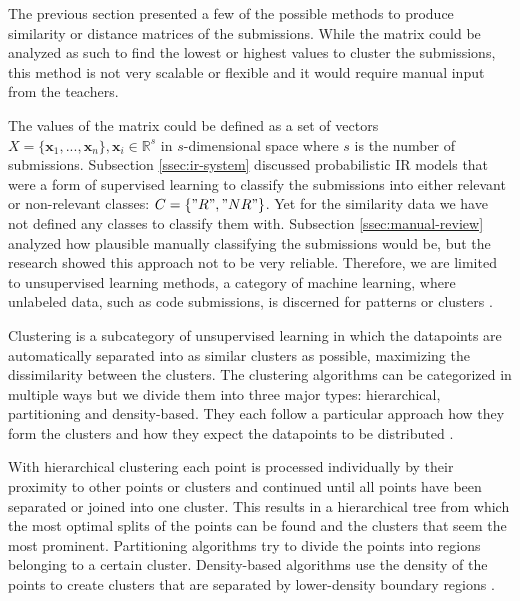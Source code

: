 The previous section presented a few of the possible methods to produce similarity or distance matrices of the submissions. While the matrix could be analyzed as such to find the lowest or highest values to cluster the submissions, this method is not very scalable or flexible and it would require manual input from the teachers.

The values of the matrix could be defined as a set of vectors $X=\{\mathbf{x}_1, ..., \mathbf{x}_n\}, \mathbf{x}_i \in \mathbb{R}^s$ in $s$-dimensional space where $s$ is the number of submissions. Subsection \ref{ssec:ir-system} discussed probabilistic IR models that were a form of supervised learning to classify the submissions into either relevant or non-relevant classes: $C=\{"R", "NR"\}$. Yet for the similarity data we have not defined any classes to classify them with. Subsection \ref{ssec:manual-review} analyzed how plausible manually classifying the submissions would be, but the research showed this approach not to be very reliable. Therefore, we are limited to unsupervised learning methods, a category of machine learning, where unlabeled data, such as code submissions, is discerned for patterns or clusters \cite{data-mining-2011}.

Clustering is a subcategory of unsupervised learning in which the datapoints are automatically separated into as similar clusters as possible, maximizing the dissimilarity between the clusters. The clustering algorithms can be categorized in multiple ways but we divide them into three major types: hierarchical, partitioning and density-based. They each follow a particular approach how they form the clusters and how they expect the datapoints to be distributed \cite{optics-1999, data-mining-2011}.

With hierarchical clustering each point is processed individually by their proximity to other points or clusters and continued until all points have been separated or joined into one cluster. This results in a hierarchical tree from which the most optimal splits of the points can be found and the clusters that seem the most prominent. Partitioning algorithms try to divide the points into regions belonging to a certain cluster. Density-based algorithms use the density of the points to create clusters that are separated by lower-density boundary regions \cite{data-mining-2011, jain-50y-kmeans-2010, optics-1999}.

